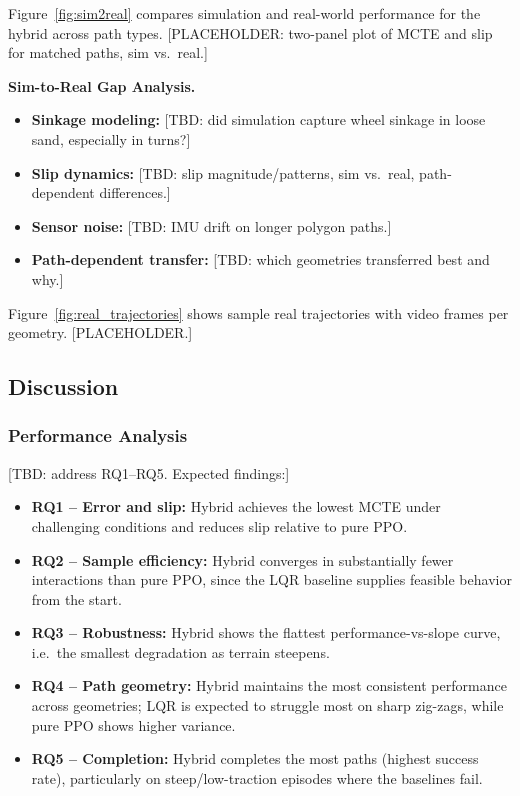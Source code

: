 \documentclass[conference]{IEEEtran}
\begin{document}
Figure~\ref{fig:sim2real} compares simulation and real-world performance for the hybrid across path types. [PLACEHOLDER: two-panel plot of MCTE and slip for matched paths, sim vs.\ real.]

\noindent\textbf{Sim-to-Real Gap Analysis.}
\begin{itemize}
\item \textbf{Sinkage modeling:} [TBD: did simulation capture wheel sinkage in loose sand, especially in turns?]
\item \textbf{Slip dynamics:} [TBD: slip magnitude/patterns, sim vs.\ real, path-dependent differences.]
\item \textbf{Sensor noise:} [TBD: IMU drift on longer polygon paths.]
\item \textbf{Path-dependent transfer:} [TBD: which geometries transferred best and why.]
\end{itemize}
Figure~\ref{fig:real_trajectories} shows sample real trajectories with video frames per geometry. [PLACEHOLDER.]

\subsection{Discussion}
\subsubsection{Performance Analysis}
[TBD: address RQ1--RQ5. Expected findings:]
\begin{itemize}
\item \textbf{RQ1 -- Error and slip:} Hybrid achieves the lowest MCTE under challenging conditions and reduces slip relative to pure PPO.
\item \textbf{RQ2 -- Sample efficiency:} Hybrid converges in substantially fewer interactions than pure PPO, since the LQR baseline supplies feasible behavior from the start.
\item \textbf{RQ3 -- Robustness:} Hybrid shows the flattest performance-vs-slope curve, i.e.\ the smallest degradation as terrain steepens.
\item \textbf{RQ4 -- Path geometry:} Hybrid maintains the most consistent performance across geometries; LQR is expected to struggle most on sharp zig-zags, while pure PPO shows higher variance.
\item \textbf{RQ5 -- Completion:} Hybrid completes the most paths (highest success rate), particularly on steep/low-traction episodes where the baselines fail.
\end{itemize}
\end{document}
